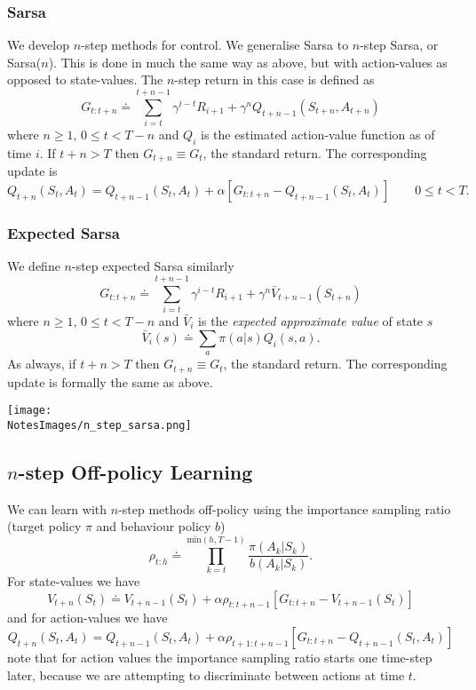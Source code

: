 \subsubsection*{Sarsa}
We develop $n$-step methods for control. We generalise Sarsa to $n$-step Sarsa, or Sarsa($n$). This is done in much the same way as above, but with action-values as opposed to state-values. The $n$-step return in this case is defined as
\begin{equation}
    G_{t:t+n} \doteq \sum_{i=t}^{t+n-1}\gamma^{i-t}R_{i+1} + \gamma^n Q_{t+n-1}(S_{t+n}, A_{t+n})
\end{equation}
where $n \geq 1$, $0 \leq t < T - n$ and $Q_i$ is the estimated action-value function as of time $i$. If $t + n > T$ then $G_{t+n} \equiv G_t$, the standard return. The corresponding update is
\begin{equation}
    Q_{t+n}(S_t, A_t) = Q_{t+n-1}(S_t, A_t) + \alpha [G_{t:t+n} - Q_{t+n-1}(S_{t}, A_{t})]  \quad\quad 0 \leq t < T.
\end{equation}

\subsubsection*{Expected Sarsa}
We define $n$-step expected Sarsa similarly
\begin{equation}
    G_{t:t+n} \doteq \sum_{i=t}^{t+n-1}\gamma^{i-t}R_{i+1} + \gamma^n \bar{V}_{t+n-1}(S_{t+n})
\end{equation}
where $n \geq 1$, $0 \leq t < T - n$ and $\bar{V}_i$ is the \emph{expected approximate value} of state $s$
\begin{equation}
    \bar{V}_i(s) \doteq \sum_a \pi(a|s)Q_i(s, a).
\end{equation} 
As always, if $t + n > T$ then $G_{t+n} \equiv G_t$, the standard return. The corresponding update is formally the same as above.


\texttt{[image: \\NotesImages/n\_step\_sarsa.png]}


\subsection{$n$-step Off-policy Learning}
We can learn with $n$-step methods off-policy using the importance sampling ratio (target policy $\pi$ and behaviour policy $b$)
\[
    \rho_{t:h} \doteq \prod_{k=t}^{\text{min}(h, T-1)}\frac{\pi(A_k|S_k)}{b(A_k|S_k)}.
\]
For state-values we have 
\[
    V_{t+n}(S_t) \doteq V_{t+n-1}(S_t) + \alpha \rho_{t:t+n-1}[G_{t:t+n} - V_{t+n-1}(S_t)]
\]
and for action-values we have
\[
    Q_{t+n}(S_t, A_t) = Q_{t+n-1}(S_t, A_t) + \alpha \rho_{t+1:t+n-1}[G_{t:t+n} - Q_{t+n-1}(S_t, A_t)]
\]
note that for action values the importance sampling ratio starts one time-step later, because we are attempting to discriminate between actions at time $t$.

